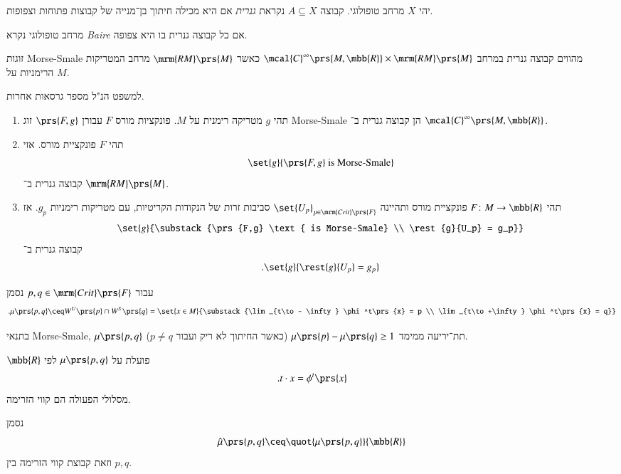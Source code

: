 \documentclass[a4paper,10pt,twoside,openany]{book}
\begin{document}
\begin{definition}
יהי
$X$
מרחב טופולוגי. קבוצה
$A \subseteq X$
נקראת
\emph{גנרית}
אם היא מכילה חיתוך בן־מנייה של קבוצות פתוחות וצפופות.
\end{definition}

\begin{definition}
מרחב טופולוגי נקרא
\emph{\textenglish{Baire}}
אם כל קבוצה גנרית בו היא צפופה.
\end{definition}

\begin{theorem}
זוגות
\textenglish{Morse-Smale}
מהווים קבוצה גנרית במרחב
$\mcal{C}^\infty\prs{M,\mbb{R}} \times \mrm{RM}\prs{M}$
כאשר
$\mrm{RM}\prs{M}$
מרחב המטריקות הרימניות על
$M$.
\end{theorem}

\begin{remark}
למשפט הנ"ל מספר גרסאות אחרות.
\begin{enumerate}
\item תהי
$g$
מטריקה רימנית על
$M$.
פונקציות מורס
$F$
עבורן
$\prs{F,g}$
זוג
\textenglish{Morse-Smale}
הן קבוצה גנרית ב־%
$\mcal{C}^\infty\prs{M,\mbb{R}}$.
\item תהי
$F$
פונקציית מורס. אזי
\[\set{g}{\prs{F,g} \text{ is Morse-Smale}}\]
קבוצה גנרית ב־%
$\mrm{RM}\prs{M}$.
\item תהי
$F \colon M \to \mbb{R}$
פונקציית מורס ותהיינה
$\set{U_p}_{p \in \mrm{Crit}\prs{F}}$
סביבות זרות של הנקודות הקריטיות, עם מטריקות רימניות
$g_p$.
אז
\[\set{g}{\substack{\prs{F,g} \text{ is Morse-Smale} \\ \rest{g}{U_p} = g_p}}\]
קבוצה גנרית ב־%
\[\text{.} \set{g}{\rest{g}{U_p} = g_p}\]
\end{enumerate}
\end{remark}

\begin{notation}
עבור
$p,q \in \mrm{Crit}\prs{F}$
נסמן
\[\text{.} \mu\prs{p,q} \ceq W^U\prs{p} \cap W^S\prs{q} = \set{x \in M}{\substack{\lim_{t\to - \infty} \phi^t\prs{x} = p \\ \lim_{t\to +\infty} \phi^t\prs{x} = q}}\]
\end{notation}

\begin{remark}
בתנאי
\textenglish{Morse-Smale},
$\mu\prs{p,q}$
תת־יריעה ממימד
$\mu\prs{p} - \mu\prs{q} \geq 1$
(כאשר החיתוך לא ריק ועבור
$p \neq q$).
\end{remark}

\begin{remark}
$\mbb{R}$
פועלת על
$\mu\prs{p,q}$
לפי
\[\text{.} t \cdot x = \phi^t\prs{x}\]
מסלולי הפעולה הם קווי הזרימה.

נסמן
\[\hat{\mu}\prs{p,q} \ceq \quot{\mu\prs{p,q}}{\mbb{R}}\]
וזאת קבוצת קווי הזרימה בין
$p,q$.
\end{remark}
\end{document}
